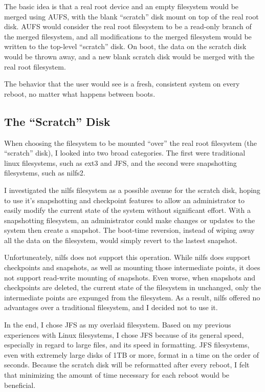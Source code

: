\documentclass[12pt]{article}
\begin{document}
The basic idea is that a real root device and an empty filesystem would be
merged using AUFS, with the blank ``scratch'' disk mount on top of the real
root disk.  AUFS would consider the real root filesystem to be a read-only
branch of the merged filesystem, and all modifications to the merged filesystem
would be written to the top-level ``scratch'' disk. On boot, the data on the
scratch disk would be thrown away, and a new blank scratch disk would be merged
with the real root filesystem.

The behavior that the user would see is a fresh, consistent system on every
reboot, no matter what happens between boots.

\subsection{The ``Scratch'' Disk}
When choosing the filesystem to be mounted ``over'' the real root filesystem
(the ``scratch'' disk), I looked into two broad categories.  The first were
traditional linux filesystems, such as ext3 and JFS, and the second were
snapshotting filesystems, such as nilfs2.  

I investigated the nilfs filesystem as a possible avenue for the scratch disk,
hoping to use it's snapshotting and checkpoint features to allow an
administrator to easily modify the current state of the system without
significant effort.  With a snapshotting filesystem, an administrator could
make changes or updates to the system then create a snapshot.  The boot-time
reversion, instead of wiping away all the data on the filesystem, would simply
revert to the lastest snapshot.

Unfortuneately, nilfs does not support this operation.  While nilfs does
support checkpoints and snapshots, as well as mounting those intermediate
points, it does not support read-write mounting of snapshots.  Even worse, when
snapshots and checkpoints are deleted, the current state of the filesystem in
unchanged, only the intermediate points are expunged from the filesystem. As a
result, nilfs offered no advantages over a traditional filesystem, and I
decided not to use it.

In the end, I chose JFS as my overlaid filesystem.  Based on my previous
experiences with Linux filesystems, I chose JFS because of its general speed,
especially in regard to large files, and its speed in formatting.  JFS
filesystems, even with extremely large disks of 1TB or more, format in a time
on the order of seconds.  Because the scratch disk will be reformatted after
every reboot, I felt that minimizing the amount of time necessary for each
reboot would be beneficial.
\end{document}
